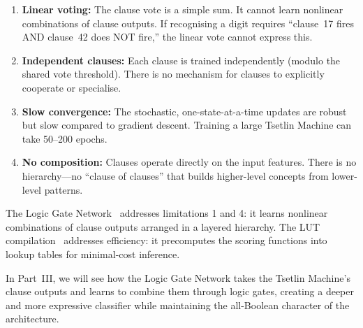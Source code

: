 \begin{enumerate}
  \item \textbf{Linear voting:} The clause vote is a simple sum. It
    cannot learn nonlinear combinations of clause outputs. If
    recognising a digit requires ``clause~17 fires AND clause~42 does
    NOT fire,'' the linear vote cannot express this.

  \item \textbf{Independent clauses:} Each clause is trained
    independently (modulo the shared vote threshold). There is no
    mechanism for clauses to explicitly cooperate or specialise.

  \item \textbf{Slow convergence:} The stochastic, one-state-at-a-time
    updates are robust but slow compared to gradient descent. Training
    a large Tsetlin Machine can take 50--200 epochs.

  \item \textbf{No composition:} Clauses operate directly on the
    input features. There is no hierarchy---no ``clause of clauses''
    that builds higher-level concepts from lower-level patterns.
\end{enumerate}

The Logic Gate Network~\cite{petersen2022difflogic} addresses limitations 1 and 4: it learns
nonlinear combinations of clause outputs arranged in a layered
hierarchy. The LUT compilation~\cite{liu2024kan} addresses efficiency: it precomputes
the scoring functions into lookup tables for minimal-cost inference.

In Part~III, we will see how the Logic Gate Network takes the Tsetlin
Machine's clause outputs and learns to combine them through logic
gates, creating a deeper and more expressive classifier while
maintaining the all-Boolean character of the architecture.
